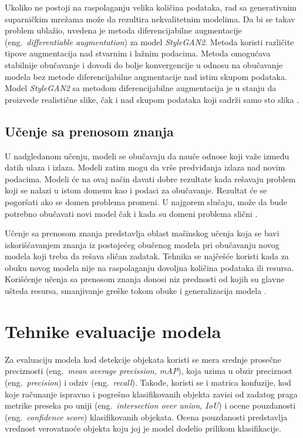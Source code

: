 \documentclass[12pt,oneside]{memoir}
\begin{document}
Ukoliko ne postoji na raspolaganju velika količina podataka, rad sa generativnim suparničkim mrežama može da rezultira nekvalitetnim modelima.
Da bi se takav problem ublažio, uvedena je metoda diferencijabilne augmentacije (eng.~\textit{differentiable augmentation}) za model \textit{StyleGAN2}. Metoda koristi različite tipove augmentacija nad stvarnim i lažnim podacima. Metoda omogućava stabilnije obučavanje i dovodi do bolje konvergencije u odnosu na obučavanje modela bez metode diferencijabilne augmentacije nad istim skupom podataka. Model \textit{StyleGAN2} sa metodom diferencijabilne augmentacija je u stanju da proizvede realistične slike, čak i nad skupom podataka koji sadrži samo sto slika \cite{zhao2020differentiable}.


\section{Učenje sa prenosom znanja}
\label{section3_trasnferucenje}
U nadgledanom učenju, modeli se obučavaju da nauče odnose koji važe između datih ulaza i izlaza. Modeli zatim mogu da vrše predviđanja izlaza nad novim podacima. Modeli će na ovaj način davati dobre rezultate kada rešavaju problem koji se nalazi u istom domenu kao i podaci za obučavanje. Rezultat će se pogoršati ako se domen problema promeni. U najgorem slučaju, može da bude potrebno obučavati novi model čak i kada su domeni problema slični \cite{zhuang2020comprehensive}.

Učenje sa prenosom znanja predstavlja oblast mašinskog učenja koja se bavi iskorišćavanjem znanja iz postojećeg obučenog modela pri obučavanju novog modela koji treba da rešava sličan zadatak. Tehnika se najčešće koristi kada za obuku novog modela nije na raspolaganju dovoljna količina podataka ili resursa. Korišćenje učenja sa prenosom znanja donosi niz prednosti od kojih su glavne ušteda resursa, smanjivanje greške tokom obuke i generalizacija modela \cite{zhuang2020comprehensive}.




\chapter{Tehnike evaluacije modela}
\label{section4}
Za evaluaciju modela kod detekcije objekata koristi se mera srednje prosečne preciznosti (eng.~\textit{mean average precission, mAP}), koja uzima u obzir preciznost (eng.~\textit{precision}) i odziv (eng.~\textit{recall}). Takođe, koristi se i matrica konfuzije, kod koje računanje ispravno i pogrešno klasifikovanih objekta zavisi od zadatog praga metrike preseka po uniji (eng.~\textit{intersection over union, IoU}) i ocene pouzdanosti (eng.~\textit{confidence score}) klasifikovanih objekata. Ocena pouzdanosti predstavlja vrednost verovatnoće objekta koju joj je model dodelio prilikom klasifikacije.
\end{document}
